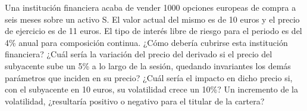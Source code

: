 \begin{problem}[4]
Una institución financiera acaba de vender 1000 opciones europeas de compra a seis meses sobre
un activo S. El valor actual del mismo es de 10 euros y el precio de ejercicio es de 11 euros. El tipo
de interés libre de riesgo para el periodo es del 4\% anual para composición continua.
\ppart ¿Cómo debería cubrirse esta institución financiera?
\ppart ¿Cuál sería la variación del precio del derivado si el precio del subyacente sube un 5\% a lo largo de la sesión, quedando invariantes los demás parámetros que inciden en su precio?
\ppart ¿Cuál sería el impacto en dicho precio si, con el subyacente en 10 euros, su volatilidad crece un 10\%?
\ppart Un incremento de la volatilidad, ¿resultaría positivo o negativo para el titular de la cartera?
\solution

\end{problem}